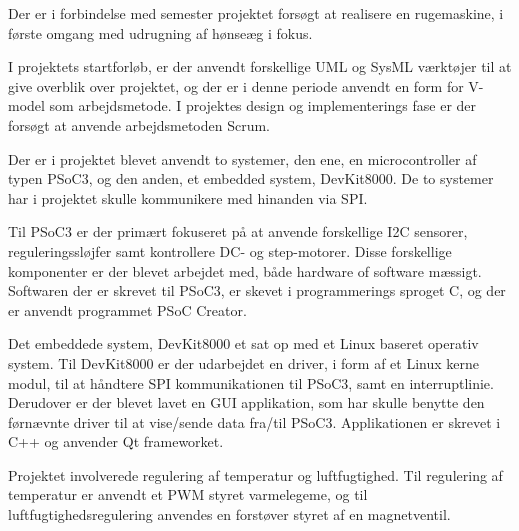 Der er i forbindelse med semester projektet forsøgt at realisere en rugemaskine, i første omgang med udrugning af hønseæg i fokus. 

I projektets startforløb, er der anvendt forskellige UML og SysML værktøjer til at give overblik over projektet, og der er i denne periode anvendt en form for V-model som arbejdsmetode. I projektes design og implementerings fase er der forsøgt at anvende arbejdsmetoden Scrum.

Der er i projektet blevet anvendt to systemer, den ene, en microcontroller af typen PSoC3, og den anden, et embedded system, DevKit8000. De to systemer har i projektet skulle kommunikere med hinanden via SPI.

Til PSoC3 er der primært fokuseret på at anvende forskellige I2C sensorer, reguleringssløjfer samt kontrollere DC- og step-motorer. Disse forskellige komponenter er der blevet arbejdet med, både hardware of software mæssigt. Softwaren der er skrevet til PSoC3, er skevet i programmerings sproget C, og der er anvendt programmet PSoC Creator.

Det embeddede system, DevKit8000 et sat op med et Linux baseret operativ system. Til DevKit8000 er der udarbejdet en driver, i form af et Linux kerne modul, til at håndtere SPI kommunikationen til PSoC3, samt en interruptlinie. Derudover er der blevet lavet en GUI applikation, som har skulle benytte den førnævnte driver til at vise/sende data fra/til PSoC3. Applikationen er skrevet i C++ og anvender Qt frameworket.

Projektet involverede regulering af temperatur og luftfugtighed. Til regulering af temperatur er anvendt et PWM styret varmelegeme, og til luftfugtighedsregulering anvendes en forstøver styret af en magnetventil. 




